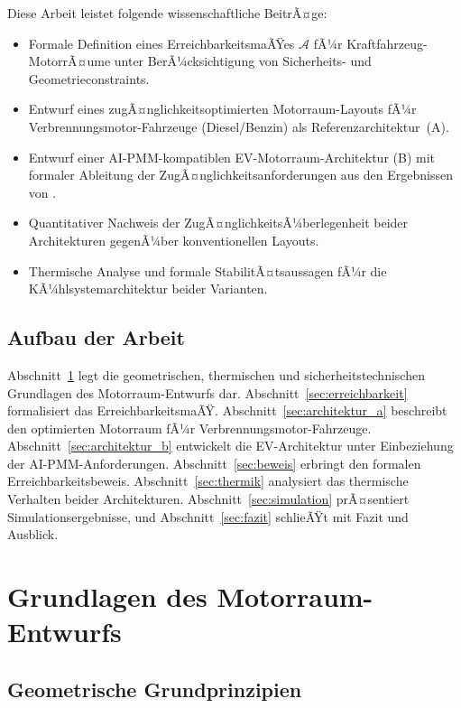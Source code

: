 ﻿\documentclass[12pt,a4paper]{article}
\begin{document}
Diese Arbeit leistet folgende wissenschaftliche BeitrÃ¤ge:

\begin{itemize}[leftmargin=*]
	\item Formale Definition eines ErreichbarkeitsmaÃŸes $\mathcal{A}$ fÃ¼r
	Kraftfahrzeug-MotorrÃ¤ume unter BerÃ¼cksichtigung von Sicherheits- und
	Geometrieconstraints.
	\item Entwurf eines zugÃ¤nglichkeitsoptimierten Motorraum-Layouts fÃ¼r
	Verbrennungsmotor-Fahrzeuge (Diesel/Benzin) als Referenzarchitektur~(A).
	\item Entwurf einer AI-PMM-kompatiblen EV-Motorraum-Architektur (B) mit
	formaler Ableitung der ZugÃ¤nglichkeitsanforderungen aus den Ergebnissen
	von \cite{Epp2026liion}.
	\item Quantitativer Nachweis der ZugÃ¤nglichkeitsÃ¼berlegenheit beider
	Architekturen gegenÃ¼ber konventionellen Layouts.
	\item Thermische Analyse und formale StabilitÃ¤tsaussagen fÃ¼r die
	KÃ¼hlsystemarchitektur beider Varianten.
\end{itemize}

\subsection{Aufbau der Arbeit}

Abschnitt~\ref{sec:grundlagen} legt die geometrischen, thermischen und
sicherheitstechnischen Grundlagen des Motorraum-Entwurfs dar. Abschnitt~\ref{sec:erreichbarkeit}
formalisiert das ErreichbarkeitsmaÃŸ. Abschnitt~\ref{sec:architektur_a} beschreibt
den optimierten Motorraum fÃ¼r Verbrennungsmotor-Fahrzeuge. Abschnitt~\ref{sec:architektur_b}
entwickelt die EV-Architektur unter Einbeziehung der AI-PMM-Anforderungen.
Abschnitt~\ref{sec:beweis} erbringt den formalen Erreichbarkeitsbeweis.
Abschnitt~\ref{sec:thermik} analysiert das thermische Verhalten beider Architekturen.
Abschnitt~\ref{sec:simulation} prÃ¤sentiert Simulationsergebnisse, und
Abschnitt~\ref{sec:fazit} schlieÃŸt mit Fazit und Ausblick.

\section{Grundlagen des Motorraum-Entwurfs}
\label{sec:grundlagen}

\subsection{Geometrische Grundprinzipien}
\end{document}
